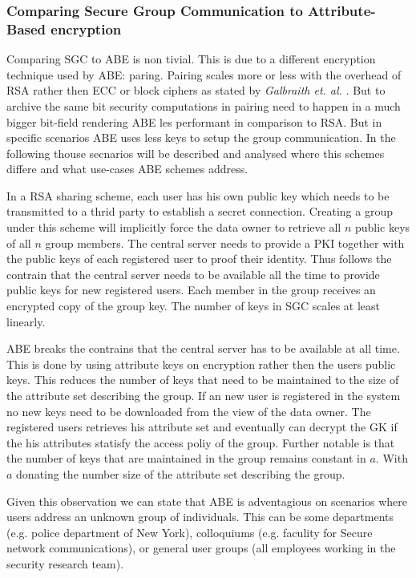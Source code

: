 \subsubsection{Comparing Secure Group Communication to Attribute-Based encryption}
Comparing SGC to ABE is non tivial. This is due to a different encryption technique used by ABE: paring. Pairing scales more or less with the overhead of RSA rather then ECC or block ciphers as stated by \textit{Galbraith et. al.} \cite{galbraith2008pairings}. But to archive the same bit security computations in pairing need to happen in a much bigger bit-field rendering ABE les performant in comparison to RSA. But in specific scenarios ABE uses less keys to setup the group communication. In the following thouse secnarios will be described and analysed where this schemes differe and what use-cases ABE schemes address.

In a RSA sharing scheme, each user has his own public key which needs to be transmitted to a thrid party to establish a secret connection. Creating a group under this scheme will implicitly force the data owner to retrieve all $n$ public keys of all $n$ group members. The central server needs to provide a PKI together with the public keys of each registered user to proof their identity. Thus follows the contrain that the central server needs to be available all the time to provide public keys for new registered users. Each member in the group receives an encrypted copy of the group key. The number of keys in SGC scales at least linearly. 

ABE breaks the contrains that the central server has to be available at all time. This is done by using attribute keys on encryption rather then the users public keys. This reduces the number of keys that need to be maintained to the size of the attribute set describing the group. If an new user is registered in the system no new keys need to be downloaded from the view of the data owner. The registered users retrieves his attribute set and eventually can decrypt the GK if the his attributes statisfy the access poliy of the group. Further notable is that the number of keys that are maintained in the group remains constant in $a$. With $a$ donating the number size of the attribute set describing the group. 

Given this observation we can state that ABE is adventagious on scenarios where users address an unknown group of individuals. This can be some departments (e.g. police department of New York), colloquiums (e.g. faculity for Secure network communications), or general user groups (all employees working in the security research team).

